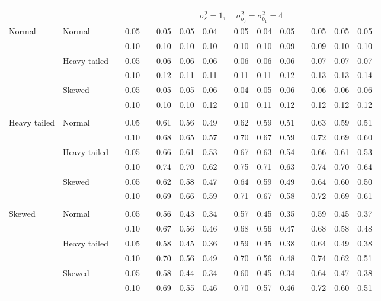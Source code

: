 \documentclass{article} %
\begin{document}
\begin{table}[ht]
\begin{scriptsize}
\begin{center}
\begin{tabular}{ll p{.1cm} c p{.1cm} rrr p{.1cm} rrr p{.1cm} rrr}
&&&&&&&&&&&&&&&\\
& && && \multicolumn{9}{c}{$\sigma_{\varepsilon}^2 = 1$, \ \ $\sigma_{b_0}^2 = \sigma_{b_1}^2 = 4$} \\ \cline{6-16}
\rowcolor{gray!20}Normal       & Normal       && 0.05 &&   0.05 & 0.05 & 0.04 && 0.05 & 0.04 & 0.05 &&  0.05 & 0.05 & 0.05 \\
\rowcolor{gray!20}             &              && 0.10 &&   0.10 & 0.10 & 0.10 && 0.10 & 0.10 & 0.09 &&  0.09 & 0.10 & 0.10 \\
\rowcolor{gray!20}             & Heavy tailed && 0.05 &&   0.06 & 0.06 & 0.06 && 0.06 & 0.06 & 0.06 &&  0.07 & 0.07 & 0.07 \\
\rowcolor{gray!20}             &              && 0.10 &&   0.12 & 0.11 & 0.11 && 0.11 & 0.11 & 0.12 &&  0.13 & 0.13 & 0.14 \\
\rowcolor{gray!20}             & Skewed       && 0.05 &&   0.05 & 0.05 & 0.06 && 0.04 & 0.05 & 0.06 &&  0.06 & 0.06 & 0.06 \\
\rowcolor{gray!20}             &              && 0.10 &&   0.10 & 0.10 & 0.12 && 0.10 & 0.11 & 0.12 &&  0.12 & 0.12 & 0.12 \\
             &&&&&&&&&&&&&&&\\
Heavy tailed & Normal       && 0.05 &&   0.61 & 0.56 & 0.49 && 0.62 & 0.59 & 0.51 &&  0.63 & 0.59 & 0.51 \\
             &              && 0.10 &&   0.68 & 0.65 & 0.57 && 0.70 & 0.67 & 0.59 &&  0.72 & 0.69 & 0.60 \\
             & Heavy tailed && 0.05 &&   0.66 & 0.61 & 0.53 && 0.67 & 0.63 & 0.54 &&  0.66 & 0.61 & 0.53 \\
             &              && 0.10 &&   0.74 & 0.70 & 0.62 && 0.75 & 0.71 & 0.63 &&  0.74 & 0.70 & 0.64 \\
             & Skewed       && 0.05 &&   0.62 & 0.58 & 0.47 && 0.64 & 0.59 & 0.49 &&  0.64 & 0.60 & 0.50 \\
             &              && 0.10 &&   0.69 & 0.66 & 0.59 && 0.71 & 0.67 & 0.58 &&  0.72 & 0.69 & 0.61 \\
             &&&&&&&&&&&&&&&\\
Skewed       & Normal       && 0.05 &&   0.56 & 0.43 & 0.34 && 0.57 & 0.45 & 0.35 &&   0.59 & 0.45 & 0.37 \\
             &              && 0.10 &&   0.67 & 0.56 & 0.46 && 0.68 & 0.56 & 0.47 &&   0.68 & 0.58 & 0.48 \\
             & Heavy tailed && 0.05 &&   0.58 & 0.45 & 0.36 && 0.59 & 0.45 & 0.38 &&   0.64 & 0.49 & 0.38 \\
             &              && 0.10 &&   0.70 & 0.56 & 0.49 && 0.70 & 0.56 & 0.48 &&   0.74 & 0.62 & 0.51 \\
             & Skewed       && 0.05 &&   0.58 & 0.44 & 0.34 && 0.60 & 0.45 & 0.34 &&   0.64 & 0.47 & 0.38 \\
             &              && 0.10 &&   0.69 & 0.55 & 0.46 && 0.70 & 0.57 & 0.46 &&   0.72 & 0.60 & 0.51 \\



\end{tabular}
\end{center}
\end{scriptsize}
\end{table}
\end{document}
